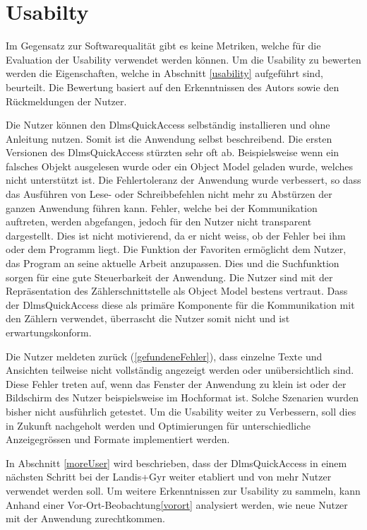 \section{Usabilty}\label{evalUsabilty}
Im Gegensatz zur Softwarequalität gibt es keine Metriken, welche für die Evaluation der Usability verwendet werden können.
Um die Usability zu bewerten werden die Eigenschaften, welche in Abschnitt \ref{usability} aufgeführt sind, beurteilt.
Die Bewertung basiert auf den Erkenntnissen des Autors sowie den Rückmeldungen der Nutzer.

Die Nutzer können den DlmsQuickAccess selbständig installieren und ohne Anleitung nutzen.
Somit ist die Anwendung selbst beschreibend.
Die ersten Versionen des DlmsQuickAccess stürzten sehr oft ab.
Beispielsweise wenn ein falsches Objekt ausgelesen wurde oder ein Object Model geladen wurde, welches nicht unterstützt ist.
Die Fehlertoleranz der Anwendung wurde verbessert, so dass das Ausführen von Lese- oder Schreibbefehlen nicht mehr zu Abstürzen der ganzen Anwendung führen kann.
Fehler, welche bei der Kommunikation auftreten, werden abgefangen, jedoch für den Nutzer nicht transparent dargestellt.
Dies ist nicht motivierend, da er nicht weiss, ob der Fehler bei ihm oder dem Programm liegt.
Die Funktion der Favoriten ermöglicht dem Nutzer, das Program an seine aktuelle Arbeit anzupassen.
Dies und die Suchfunktion sorgen für eine gute Steuerbarkeit der Anwendung.
Die Nutzer sind mit der Repräsentation des Zählerschnittstelle als Object Model bestens vertraut.
Dass der DlmsQuickAccess diese als primäre Komponente für die Kommunikation mit den Zählern verwendet, überrascht die Nutzer somit nicht und ist erwartungskonform.

Die Nutzer meldeten zurück (\ref{gefundeneFehler}), dass einzelne Texte und Ansichten teilweise nicht vollständig angezeigt werden oder unübersichtlich sind.
Diese Fehler treten auf, wenn das Fenster der Anwendung zu klein ist oder der Bildschirm des Nutzer beispielsweise im Hochformat ist.
Solche Szenarien wurden bisher nicht ausführlich getestet.
Um die Usability weiter zu Verbessern, soll dies in Zukunft nachgeholt werden und Optimierungen für unterschiedliche Anzeigegrössen und Formate implementiert werden.

In Abschnitt \ref{moreUser} wird beschrieben, dass der DlmsQuickAccess in einem nächsten Schritt bei der Landis+Gyr weiter etabliert und von mehr Nutzer verwendet werden soll.
Um weitere Erkenntnissen zur Usability zu sammeln, kann Anhand einer Vor-Ort-Beobachtung\ref{vorort} analysiert werden, wie neue Nutzer mit der Anwendung zurechtkommen.
